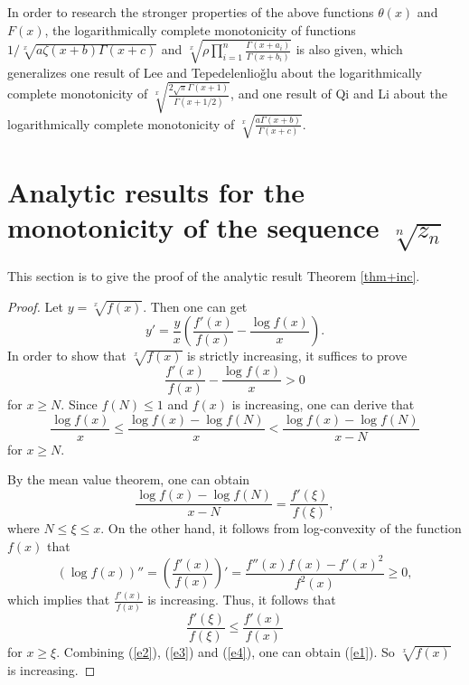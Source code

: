 \documentclass[12pt,reqno]{article}
\theoremstyle{definition}
\numberwithin{equation}{section}
\begin{document}
 In order to research the stronger properties of the above
functions $\theta(x)$ and $F(x)$, the logarithmically complete
monotonicity of functions $1/\sqrt[x]{a \zeta(x+b)\Gamma(x+c)}$ and
$\sqrt[x]{\rho\prod_{i=1}^n\frac{\Gamma(x+a_i)}{\Gamma(x+b_i)}}$ is
also given, which generalizes one result of Lee and
Tepedelenlio\v{g}lu about the logarithmically complete monotonicity
of $\sqrt[x]{\frac{2\sqrt{\pi}\Gamma(x+1)}{\Gamma(x+1/2)}}$,  and
one result of Qi and Li about the logarithmically complete
monotonicity of $\sqrt[x]{\frac{a\Gamma(x+b)}{\Gamma(x+c)}}$.

\section{Analytic results for the
monotonicity of the sequence $\sqrt[n]{z_n}$}

This section is to give the proof of the analytic result Theorem
\ref{thm+inc}.
\begin{proof}\quad Let $y=\sqrt[x]{f(x)}$. Then one can get
\begin{equation*}
y'=\frac{y}{x}\left(\frac{f'(x)}{f(x)}-\frac{\log{f(x)}}{x}\right).
\end{equation*}
In order to show that $\sqrt[x]{f(x)}$ is strictly increasing, it
suffices to prove
\begin{equation}\label{e1}
\frac{f'(x)}{f(x)}-\frac{\log{f(x)}}{x}>0
\end{equation}
for $x\geq N$. Since $f(N)\leq 1$ and $f(x)$ is increasing, one can
derive that
\begin{equation}\label{e2}
\frac{\log{f(x)}}{x}\leq\frac{\log{f(x)}-\log{f(N)}}{x}<\frac{\log{f(x)}-\log{f(N)}}{x-N}
\end{equation}
for $x\geq N$.

 By the mean value theorem, one can obtain
\begin{equation}\label{e3}
\frac{\log{f(x)}-\log{f(N)}}{x-N}=\frac{f'(\xi)}{f(\xi)},
\end{equation}
where $N\leq\xi\leq x$. On the other hand, it follows from
log-convexity of the function $f(x)$ that
\begin{equation}
\left(\log{f(x)}\right)''=\left(\frac{f'(x)}{f(x)}\right)'=\frac{f''(x)f(x)-f'(x)^2}{f^2(x)}\geq0,
\end{equation}
which implies that $\frac{f'(x)}{f(x)}$ is increasing. Thus,  it
follows that
\begin{equation}\label{e4}
\frac{f'(\xi)}{f(\xi)}\leq\frac{f'(x)}{f(x)}
\end{equation}
for $x\geq\xi.$ Combining (\ref{e2}), (\ref{e3}) and (\ref{e4}), one
can obtain (\ref{e1}). So $\sqrt[x]{f(x)}$ is increasing.
\end{proof}
\end{document}
